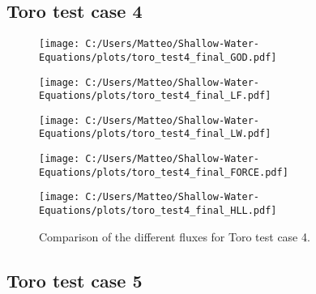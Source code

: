 \subsection{Toro test case 4}\label{app:toro_test_case_4}
\begin{figure}[H]
    \centering
    \begin{minipage}{0.45\textwidth}
        \centering
        \texttt{[image: C:/Users/Matteo/Shallow-Water-Equations/plots/toro\_test4\_final\_GOD.pdf]}
    \end{minipage}%
    \hfill
    \begin{minipage}{0.45\textwidth}
        \centering
        \texttt{[image: C:/Users/Matteo/Shallow-Water-Equations/plots/toro\_test4\_final\_LF.pdf]}
    \end{minipage}
    
    \vspace{0.5cm} %
    
    \begin{minipage}{0.45\textwidth}
        \centering
        \texttt{[image: C:/Users/Matteo/Shallow-Water-Equations/plots/toro\_test4\_final\_LW.pdf]}
    \end{minipage}%
    \hfill
    \begin{minipage}{0.45\textwidth}
        \centering
        \texttt{[image: C:/Users/Matteo/Shallow-Water-Equations/plots/toro\_test4\_final\_FORCE.pdf]}
    \end{minipage}

    \vspace{0.5cm} %
    
    \begin{minipage}{0.45\textwidth}
        \centering
        \texttt{[image: C:/Users/Matteo/Shallow-Water-Equations/plots/toro\_test4\_final\_HLL.pdf]}
    \end{minipage}
    \caption{Comparison of the different fluxes for Toro test case 4.}\label{fig:toro_test4_fluxes}
\end{figure}



\subsection{Toro test case 5}\label{app:toro_test_case_5}

